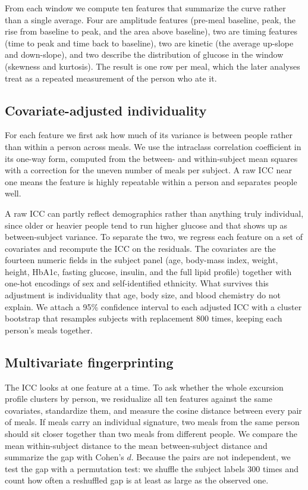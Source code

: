 \documentclass[10pt,conference,compsoc]{IEEEtran}
\begin{document}
From each window we compute ten features that summarize the curve rather than a
single average. Four are amplitude features (pre-meal baseline, peak, the rise
from baseline to peak, and the area above baseline), two are timing features
(time to peak and time back to baseline), two are kinetic (the average up-slope
and down-slope), and two describe the distribution of glucose in the window
(skewness and kurtosis). The result is one row per meal, which the later analyses
treat as a repeated measurement of the person who ate it.

\subsection{Covariate-adjusted individuality}
For each feature we first ask how much of its variance is between people rather
than within a person across meals. We use the intraclass correlation coefficient
in its one-way form, computed from the between- and within-subject mean squares
with a correction for the uneven number of meals per subject. A raw ICC near one
means the feature is highly repeatable within a person and separates people well.

A raw ICC can partly reflect demographics rather than anything truly individual,
since older or heavier people tend to run higher glucose and that shows up as
between-subject variance. To separate the two, we regress each feature on a set
of covariates and recompute the ICC on the residuals. The covariates are the
fourteen numeric fields in the subject panel (age, body-mass index, weight,
height, HbA1c, fasting glucose, insulin, and the full lipid profile) together
with one-hot encodings of sex and self-identified ethnicity. What survives this
adjustment is individuality that age, body size, and blood chemistry do not
explain. We attach a 95\% confidence interval to each adjusted ICC with a cluster
bootstrap that resamples subjects with replacement 800 times, keeping each
person's meals together.

\subsection{Multivariate fingerprinting}
The ICC looks at one feature at a time. To ask whether the whole excursion profile
clusters by person, we residualize all ten features against the same covariates,
standardize them, and measure the cosine distance between every pair of meals. If
meals carry an individual signature, two meals from the same person should sit
closer together than two meals from different people. We compare the mean
within-subject distance to the mean between-subject distance and summarize the gap
with Cohen's $d$. Because the pairs are not independent, we test the gap with a
permutation test: we shuffle the subject labels 300 times and count how often a
reshuffled gap is at least as large as the observed one.
\end{document}
